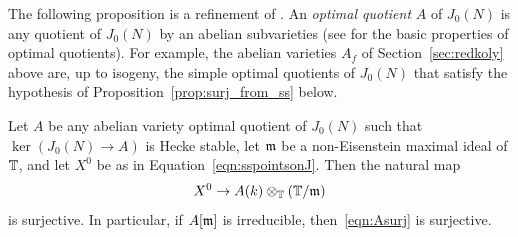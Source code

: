\documentclass{article} \usepackage[active]{srcltx}
\begin{document}
The following proposition is a refinement of
\cite[Prop.~4.4]{cornut:mazur}.  An {\em optimal quotient} $A$ of
$J_0(N)$ is any quotient of $J_0(N)$ by an abelian subvarieties (see
\cite[\S3]{conrad-stein:compgroup} for the basic properties of optimal
quotients).  For example, the abelian varieties $A_f$ of
Section~\ref{sec:redkoly} above are, up to isogeny, the simple
optimal quotients of $J_0(N)$ that satisfy the hypothesis of
Proposition~\ref{prop:surj_from_ss} below.

\begin{proposition}\label{prop:surj_from_ss}
  Let $A$ be any abelian variety optimal quotient of $J_0(N)$ such
  that $\ker(J_0(N)\to A)$ is Hecke stable, let $\mathfrak{m}$ be a
  non-Eisenstein maximal ideal of $\mathbb{T}$, and let $X^0$ be as in
  Equation~\eqref{eqn:sspointsonJ}.  Then the natural map
\begin{equation}\label{eqn:Asurj}
  X^0 \to A(k) \otimes_{\mathbb{T}} (\mathbb{T}/\mathfrak{m})
\end{equation}
is surjective.  In particular, if $A[\mathfrak{m}]$ is irreducible,
then~\eqref{eqn:Asurj} is surjective.
\end{proposition}
\end{document}
